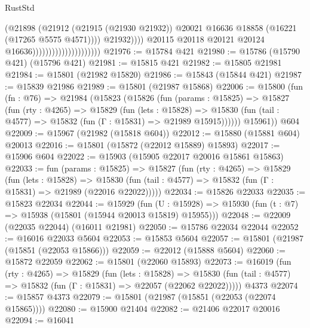 \begin{lexlean}{RustStd}
\begin{coremodule}
                                                      (@21898
                                                        (@21912
                                                          (@21915 (@21930 @21932))
                                                          @20021
                                                          @16636
                                                          @18858
                                                          (@16221 (@17265 @5575 @4571))))
                                                      @21932))))
                                              @20115
                                              @20118
                                              @20121
                                              @20124
                                              @16636)))))))))))))))))))))
@21976 := @15784 @421
@21980 := @15786 (@15790 @421) (@15796 @421)
@21981 := @15815 @421
@21982 := @15805 @21981
@21984 := @15801 (@21982 @15820)
@21986 := @15843 (@15844 @421)
@21987 := @15839 @21986
@21989 := @15801 (@21987 @15868)
@22006 := @15800
    (fun (fn : @76) =>
    @21984
      (@15823
        (@15826
          (fun (params : @15825) =>
          @15827
            (fun (rty : @4265) =>
            @15829
              (fun (lets : @15828) =>
              @15830 (fun (tail : @4577) => @15832 (fun (Γ : @15831) => @21989 @15915))))))
        @15961))
    @604
@22009 := @15967 (@21982 (@15818 @604))
@22012 := @15880 (@15881 @604) @20013
@22016 := @15801 (@15872 (@22012 @15889) @15893)
@22017 := @15906 @604
@22022 := @15903 (@15905 @22017 @20016 @15861 @15863)
@22033 := fun (params : @15825) =>
  @15827
    (fun (rty : @4265) =>
    @15829
      (fun (lets : @15828) =>
      @15830 (fun (tail : @4577) => @15832 (fun (Γ : @15831) => @21989 (@22016 @22022)))))
@22034 := @15826 @22033
@22035 := @15823 @22034
@22044 := @15929
    (fun (U : @15928) => @15930 (fun (t : @7) => @15938 (@15801 (@15944 @20013 @15819) @15955)))
@22048 := @22009 (@22035 @22044) (@16011 @21981)
@22050 := @15786 @22034 @22044
@22052 := @16016 @22033 @5604
@22053 := @15853 @5604
@22057 := @15801 (@21987 (@15851 (@22053 @15866)))
@22059 := @22012 (@15888 @5604)
@22060 := @15872 @22059
@22062 := @15801 (@22060 @15893)
@22073 := @16019
    (fun (rty : @4265) =>
    @15829
      (fun (lets : @15828) =>
      @15830 (fun (tail : @4577) => @15832 (fun (Γ : @15831) => @22057 (@22062 @22022)))))
    @4373
@22074 := @15857 @4373
@22079 := @15801 (@21987 (@15851 (@22053 (@22074 @15865))))
@22080 := @15900 @21404
@22082 := @21406 @22017 @20016
@22094 := @16041

\end{coremodule}
\end{lexlean}
